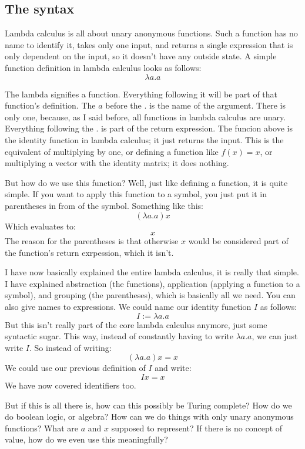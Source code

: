 \documentclass[a4paper, 11pt]{article}
\begin{document}

\subsection{The syntax}

Lambda calculus is all about unary anonymous functions. Such a function has no
name to identify it, takes only one input, and returns a single expression that
is only dependent on the input, so it doesn't have any outside state. A simple
function definition in lambda calculus looks as follows:
\[\lambda a.a\]

The lambda signifies a function. Everything following it will be part of that
function's definition. The \(a\) before the \(.\) is the name of the argument.
There is only one, because, as I said before, all functions in lambda calculus
are unary. Everything following the \(.\) is part of the return expression. The
funcion above is the identity function in lambda calculus; it just returns the
input. This is the equivalent of multiplying by one, or defining a function
like \(f(x)=x\), or multiplying a vector with the identity matrix; it does
nothing.

But how do we use this function? Well, just like defining a function, it is
quite simple. If you want to apply this function to a symbol, you just put it
in parentheses in from of the symbol. Something like this:
\[(\lambda a.a)x\]
Which evaluates to:
\[x\]
The reason for the parentheses is that otherwise \(x\) would be considered part
of the function's return exrpession, which it isn't.

I have now basically explained the entire lambda calculus, it is really that
simple. I have explained abstraction (the functions), application (applying a
function to a symbol), and grouping (the parentheses), which is basically all
we need. You can also give names to expressions. We could name our identity
function \(I\) as follows: \[I:=\lambda a.a\] But this isn't really part of the
core lambda calculus anymore, just some syntactic sugar. This way, instead of
constantly having to write \(\lambda a.a\), we can just write \(I\). So instead
of writing:
\[(\lambda a.a)x=x\]
We could use our previous definition of \(I\) and write:
\[Ix=x\]
We have now covered identifiers too.

But if this is all there is, how can this possibly be Turing complete? How do
we do boolean logic, or algebra? How can we do things with only unary anonymous
functions? What are \(a\) and \(x\) supposed to represent? If there is no
concept of value, how do we even use this meaningfully?
\end{document}
